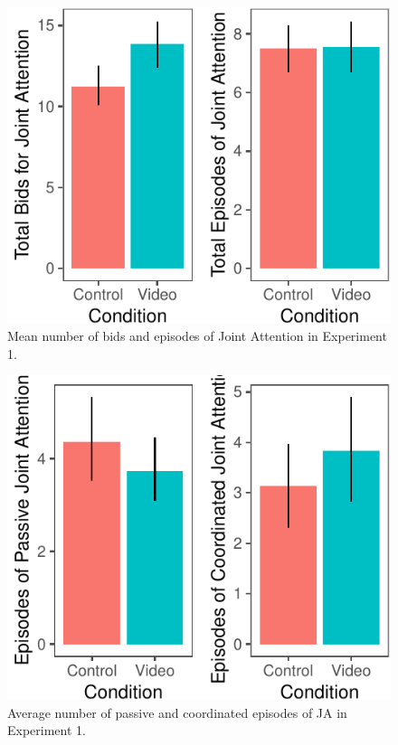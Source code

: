 \documentclass[10pt, letterpaper]{article}
\newenvironment{CodeChunk}{}{}
\begin{document}
\begin{CodeChunk}
\begin{figure}[H]

{\centering \includegraphics{figs/e1ja-graphs-1} 

}

\caption[Mean number of bids and episodes of Joint Attention in Experiment 1]{Mean number of bids and episodes of Joint Attention in Experiment 1.}\label{fig:e1ja-graphs}
\end{figure}
\end{CodeChunk}

\begin{CodeChunk}
\begin{figure}[H]

{\centering \includegraphics{figs/e1ja-graphs-pass-coord-1} 

}

\caption[Average number of passive and coordinated episodes of JA in Experiment 1]{Average number of passive and coordinated episodes of JA in Experiment 1.}\label{fig:e1ja-graphs-pass-coord}
\end{figure}
\end{CodeChunk}
\end{document}
